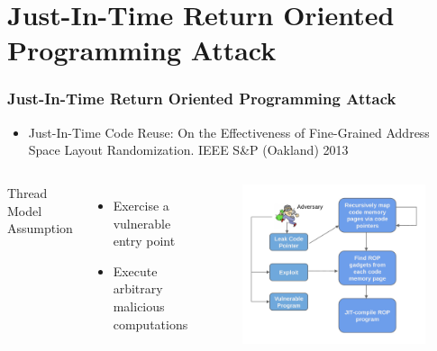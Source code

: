 \documentclass[aspectratio=169]{beamer}
\begin{document}
\section{Just-In-Time Return Oriented Programming Attack}
\begin{frame}
\frametitle{Just-In-Time Return Oriented Programming Attack}
\begin{itemize}
\item Just-In-Time Code Reuse: On the Effectiveness of Fine-Grained Address Space Layout Randomization. IEEE S\&P (Oakland) 2013
\end{itemize}	
\begin{columns}[c]
Thread Model Assumption
\begin{itemize}
\item Exercise a vulnerable entry point
\item Execute arbitrary malicious computations
\end{itemize}
\begin{figure}
\includegraphics[width=1.0\linewidth]{figures/jitrop.pdf}
\end{figure}
\end{columns}

\end{frame}

\end{document}
